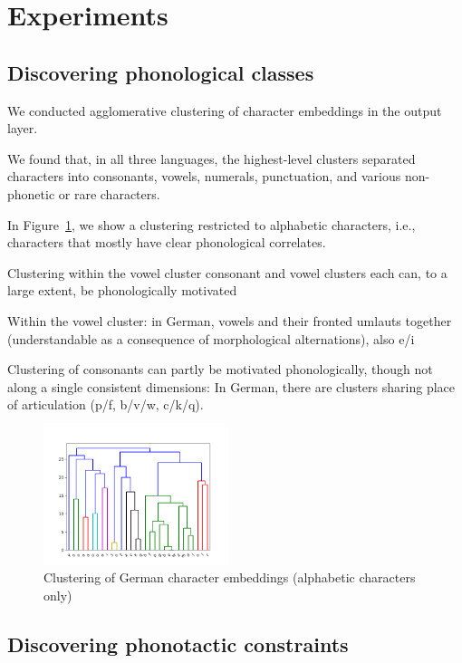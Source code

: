 \section{Experiments}
\label{sec:experiments}


\subsection{Discovering phonological classes}

We conducted agglomerative clustering of character embeddings in the output layer.

We found that, in all three languages, the highest-level clusters separated characters into consonants, vowels, numerals, punctuation, and various non-phonetic or rare characters.


In Figure~\ref{fig:char-clustering}, we show a clustering restricted to alphabetic characters, i.e., characters that mostly have clear phonological correlates.

Clustering within the vowel cluster
consonant and vowel clusters each can, to a large extent, be phonologically motivated

Within the vowel cluster: in German, vowels and their fronted umlauts together (understandable as a consequence of morphological alternations), also e/i 

Clustering of consonants can partly be motivated phonologically, though not along a single consistent dimensions:
In German, there are clusters sharing place of articulation (p/f, b/v/w, c/k/q). %


\begin{figure}
\includegraphics[width=0.48\textwidth]{figures/char-emb-clustering-output_output-phonetic-wiki-german-nospaces-bptt-910515909.png}
\caption{Clustering of German character embeddings (alphabetic characters only)}\label{fig:char-clustering}
\end{figure}




\subsection{Discovering phonotactic constraints}
\label{sec:phonotactics}

